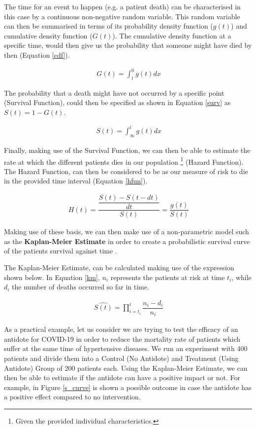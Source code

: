 The time for an event to happen (e.g. a patient death) can be characterised in this case by a continuous non-negative random variable. This random variable can then be summarised in terms of its probability density function ($g(t)$) and cumulative density function ($G(t)$). The cumulative density function at a specific time, would then give us the probability that someone might have died by then (Equation \ref{cdf}).

\useshortskip
\begin{align}
\ G(t) =\int_{t}^{0} g(t) dx
\label{cdf}
\end{align}
\useshortskip

The probability that a death might have not occurred by a specific point (Survival Function), could then be specified as shown in Equation \ref{surv} as $S(t) = 1 - G(t)$.

\useshortskip
\begin{align}
\ S(t) =\int_{\infty}^{t} g(t) dx
\label{surv}
\end{align}
\useshortskip

Finally, making use of the Survival Function, we can then be able to estimate the rate at which the different patients dies in our population \footnote{Given the provided individual characteristics.} (Hazard Function). The Hazard Function, can then be considered to be as our measure of risk to die in the provided time interval (Equation \ref{hfun}).

\useshortskip
\begin{align}
\ H(t) = \dfrac{\dfrac{S(t) - S(t - dt)}{dt}}{S(t)} = \dfrac{g(t)}{S(t)}
\label{hfun}
\end{align}
\useshortskip

Making use of these basis, we can then make use of a non-parametric model such as the \textbf{Kaplan-Meier Estimate} in order to create a probabilistic survival curve of the patients survival against time \cite{survival_an}.

The Kaplan-Meier Estimate, can be calculated making use of the expression shown below. In Equation \ref{km}, $n_{i}$ represents the patients at risk at time $t_{i}$, while $d_{i}$ the number of deaths occurred so far in time.

\useshortskip
\begin{align}
\ \widehat{S(t)} = \prod_{i=t_{i}}^{t} \dfrac{n_{i}-d_{i}}{n_{i}}
\label{km}
\end{align}
\useshortskip

As a practical example, let us consider we are trying to test the efficacy of an antidote for COVID-19 in order to reduce the mortality rate of patients which suffer at the same time of hypertensive diseases. We run an experiment with 400 patients and divide them into a Control (No Antidote) and Treatment (Using Antidote) Group of 200 patients each. Using the Kaplan-Meier Estimate, we can then be able to estimate if the antidote can have a positive impact or not. For example, in Figure \ref{s_curve} is shown a possible outcome in case the antidote has a positive effect compared to no intervention.

